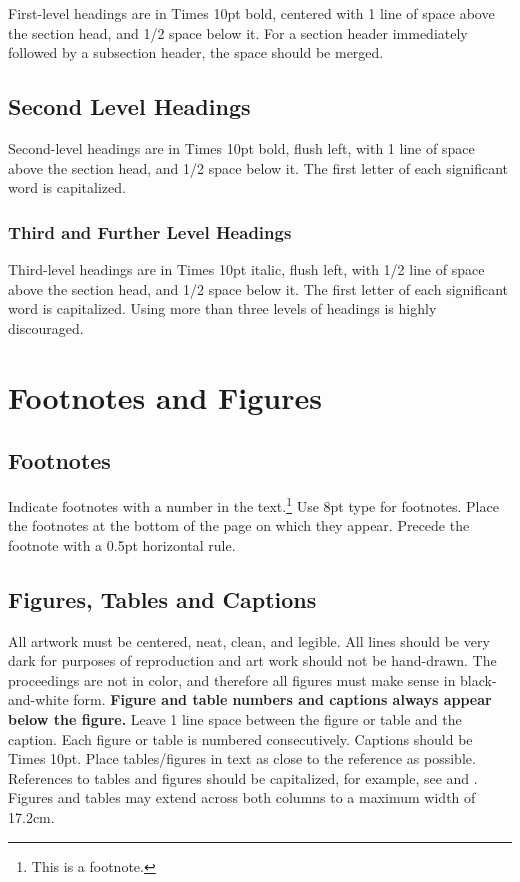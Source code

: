 \documentclass{article}
\begin{document}
First-level headings are in Times 10pt bold, centered with 1 line of space above the section head, and 1/2 space below it. For a section header immediately followed by a subsection header, the space should be merged.

\subsection{Second Level Headings}

Second-level headings are in Times 10pt bold, flush left, with 1 line of space above the section head, and 1/2 space below it. The first letter of each significant word is capitalized.

\subsubsection{Third and Further Level Headings}

Third-level headings are in Times 10pt italic, flush left, with 1/2 line of space above the section head, and 1/2 space below it. The first letter of each significant word is capitalized. Using more than three levels of headings is highly discouraged.

\section{Footnotes and Figures}

\subsection{Footnotes}

Indicate footnotes with a number in the text.\footnote{This is a footnote.} Use 8pt type for footnotes. Place the footnotes at the bottom of the page on which they appear. Precede the footnote with a 0.5pt horizontal rule.

\subsection{Figures, Tables and Captions}

All artwork must be centered, neat, clean, and legible. All lines should be very dark for purposes of reproduction and art work should not be hand-drawn. The proceedings are not in color, and therefore all figures must make sense in black-and-white form. \textbf{Figure and table numbers and captions always appear below the figure.} Leave 1 line space between the figure or table and the caption. Each figure or table is numbered consecutively. Captions should be Times 10pt. Place tables/figures in text as close to the reference as possible. References to tables and figures should be capitalized, for example, see  and . Figures and tables may extend across both columns to a maximum width of 17.2cm.
\end{document}

